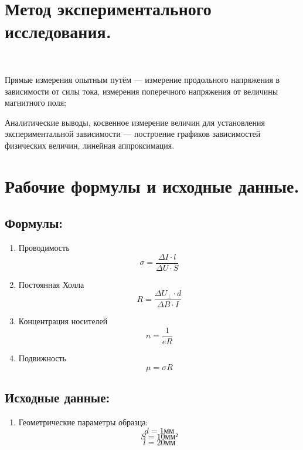 \documentclass[12pt,letterpaper]{article}
\begin{document}
      \section{Метод экспериментального исследования.}\
      \par Прямые измерения опытным путём — измерение продольного напряжения в зависимости от силы тока, измерения поперечного напряжения от величины магнитного поля;\
      \par Аналитические выводы, косвенное измерение величин для установления экспериментальной зависимости — построение графиков зависимостей физических величин, линейная аппроксимация.


      \section{Рабочие формулы и исходные данные.}\par
        \subsection{Формулы:}
        \begin{enumerate}
            \item Проводимость
                \begin{equation}
                    \sigma  = \frac{\Delta I \cdot l}{\Delta U \cdot S}
                \end{equation}
            \item Постоянная Холла
                \begin{equation}
                    R=\frac{\Delta U_{\bot}\cdot d}{\Delta B\cdot I}
                \end{equation}
            \item Концентрация носителей
                \begin{equation}
                    n=\frac{1}{eR}
                \end{equation}
            \item Подвижность
                \begin{equation}
                    \mu=\sigma R
                \end{equation}
        \end{enumerate}
        \subsection{Исходные данные:}
        \begin{enumerate}
            \item Геометрические параметры образца:
            $$d=1\textit{мм}$$
            $$S=10\textit{мм²}$$
            $$l=20\textit{мм}$$
        \end{enumerate}
\end{document}
